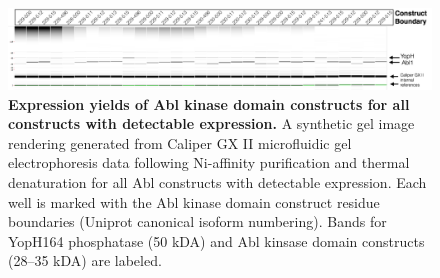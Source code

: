 \documentclass[phd,tocprelim]{cornell}
\begin{document}
\begin{landscape}
	\begin{figure}[p]
		\centering
		 \includegraphics[width=\linewidth]{figures/abl1-construct-gel.pdf}
		\caption[Expression yields of Abl kinase domain constructs for all constructs with detectable expression.]{{\bf Expression yields of Abl kinase domain constructs for all constructs with detectable expression.}
			A synthetic gel image rendering generated from Caliper GX II microfluidic gel electrophoresis data following Ni-affinity purification and thermal denaturation for all Abl constructs with detectable expression. 
			Each well is marked with the Abl kinase domain construct residue boundaries (Uniprot canonical isoform numbering). 
			Bands for YopH164 phosphatase (50 kDA) and Abl kinsase domain constructs (28--35 kDA) are labeled. 
		}
		\label{fig:abl1_caliper_image}
	\end{figure}
\end{landscape}
\end{document}
